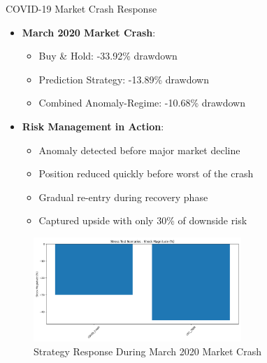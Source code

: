 \documentclass[aspectratio=169,xcolor=dvipsnames]{beamer}
\begin{document}
\begin{frame}{COVID-19 Market Crash Response}
	\begin{itemize}
		\item \textbf{March 2020 Market Crash}:
		      \begin{itemize}
			      \item Buy \& Hold: -33.92\% drawdown
			      \item Prediction Strategy: -13.89\% drawdown
			      \item Combined Anomaly-Regime: -10.68\% drawdown
		      \end{itemize}
		\item \textbf{Risk Management in Action}:
		      \begin{itemize}
			      \item Anomaly detected before major market decline
			      \item Position reduced quickly before worst of the crash
			      \item Gradual re-entry during recovery phase
			      \item Captured upside with only 30\% of downside risk
		      \end{itemize}
	\end{itemize}
\end{frame}
\begin{frame}
	\begin{figure}
		\centering
		\includegraphics[width=0.7\textwidth]{covid_crash_response.png}
		\caption{Strategy Response During March 2020 Market Crash}
	\end{figure}
\end{frame}
\end{document}
